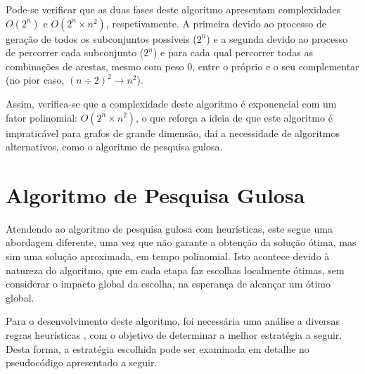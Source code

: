 \documentclass[mirror, portugues]{revdetua}
\begin{document}
Pode-se verificar que as duas fases deste algoritmo apresentam complexidades $O(2^n)$ e $O(2^n \times n^2)$, respetivamente. A primeira devido ao processo de geração de todos os subconjuntos possíveis ($2^n$) e a segunda devido ao processo de percorrer cada subconjunto ($2^n$) e para cada qual percorrer todas as combinações de arestas, mesmo com peso $0$, entre o próprio e o seu complementar (no pior caso, $(n \div 2)^2 \rightarrow n^2$).

Assim, verifica-se que a complexidade deste algoritmo é exponencial com um fator polinomial: $O(2^n \times n^2)$, o que reforça a ideia de que este algoritmo é impraticável para grafos de grande dimensão, daí a necessidade de algoritmos alternativos, como o algoritmo de pesquisa gulosa.


\section{Algoritmo de Pesquisa Gulosa}

Atendendo ao algoritmo de pesquisa gulosa com heurísticas, este segue uma abordagem diferente, uma vez que não garante a obtenção da solução ótima, mas sim uma solução aproximada, em tempo polinomial. Isto acontece devido à natureza do algoritmo, que em cada etapa faz escolhas localmente ótimas, sem considerar o impacto global da escolha, na esperança de alcançar um ótimo global.

Para o desenvolvimento deste algoritmo, foi necessária uma análise a diversas regras heurísticas \cite{WANG23}, com o objetivo de determinar a melhor estratégia a seguir. Desta forma, a estratégia escolhida pode ser examinada em detalhe no pseudocódigo apresentado a seguir.
\end{document}
